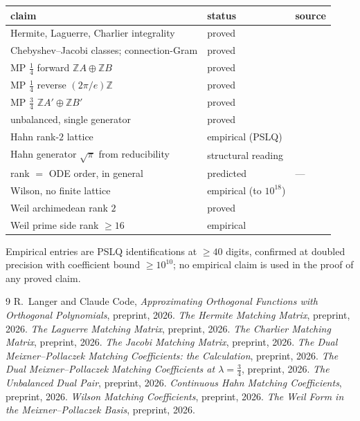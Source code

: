 \documentclass[11pt,a4paper]{article}
\newcommand{\Z}{\mathbb{Z}}
\begin{document}
\begin{center}
\begin{tabular}{lll}
\toprule
claim & status & source \\
\midrule
Hermite, Laguerre, Charlier integrality & proved & \cite{herm,lag,char} \\
Chebyshev--Jacobi classes; connection-Gram & proved & \cite{jac} \\
MP $\tfrac14$ forward $\Z A \oplus \Z B$ & proved & \cite{mp14} \\
MP $\tfrac14$ reverse $(2\pi/e)\Z$ & proved & \cite{mp14} \\
MP $\tfrac34$ $\Z A' \oplus \Z B'$ & proved & \cite{mp34} \\
unbalanced, single generator & proved & \cite{unb} \\
Hahn rank-$2$ lattice & empirical (PSLQ) & \cite{hahn} \\
Hahn generator $\sqrt{\pi}$ from reducibility & structural reading & \cite{hahn} \\
rank $=$ ODE order, in general & predicted & --- \\
Wilson, no finite lattice & empirical (to $10^{18}$) & \cite{wil} \\
Weil archimedean rank $2$ & proved & \cite{weil} \\
Weil prime side rank $\ge 16$ & empirical & \cite{weil} \\
\bottomrule
\end{tabular}
\end{center}

Empirical entries are PSLQ identifications at $\ge 40$ digits,
confirmed at doubled precision with coefficient bound $\ge 10^{10}$;
no empirical claim is used in the proof of any proved claim.

\begin{thebibliography}{9}
 R.~Langer and Claude Code,
\emph{Approximating Orthogonal Functions with Orthogonal Polynomials},
preprint, 2026.
 \emph{The Hermite Matching Matrix}, preprint, 2026.
 \emph{The Laguerre Matching Matrix}, preprint, 2026.
 \emph{The Charlier Matching Matrix}, preprint, 2026.
 \emph{The Jacobi Matching Matrix}, preprint, 2026.
 \emph{The Dual Meixner--Pollaczek Matching Coefficients:
the Calculation}, preprint, 2026.
 \emph{The Dual Meixner--Pollaczek Matching Coefficients
at $\lambda = \tfrac34$}, preprint, 2026.
 \emph{The Unbalanced Dual Pair}, preprint, 2026.
 \emph{Continuous Hahn Matching Coefficients}, preprint,
2026.
 \emph{Wilson Matching Coefficients}, preprint, 2026.
 \emph{The Weil Form in the Meixner--Pollaczek Basis},
preprint, 2026.
\end{thebibliography}
\end{document}
